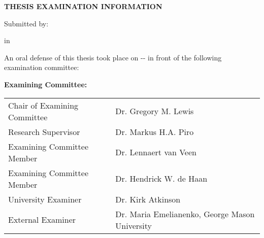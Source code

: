 
\cleardoublepage
\thispagestyle{plain}

\begin{center}
\textbf{THESIS EXAMINATION INFORMATION}

\bigskip

Submitted by:  \makeatletter\textbf{\@firstname\ {\@lastname}}\makeatother

\bigskip
\bigskip

\textbf{\degree} in \textbf{\program}

\end{center}


\bigskip
\bigskip

\noindent {}

\bigskip

\noindent An oral defense of this thesis took place on -\degreemonth-\degreeyear{} in front of the following examination committee:

\medskip

\noindent\textbf{Examining Committee:}

\medskip

\begingroup
\renewcommand{\arraystretch}{1.5}
\begin{tabular}{lcl}
    Chair of Examining Committee &\phantom{abc}& Dr. Gregory  M. Lewis\\
    Research Supervisor && Dr. Markus H.A. Piro\\
    Examining Committee Member && Dr. Lennaert van Veen \\
    Examining Committee Member && Dr. Hendrick W. de Haan \\
    University Examiner && Dr. Kirk Atkinson \\
    External Examiner && Dr. Maria Emelianenko, George Mason University\\
\end{tabular}
\endgroup

\medskip

